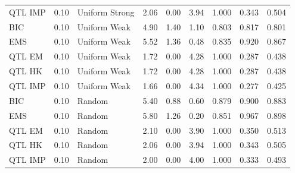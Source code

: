 \documentclass[
  12pt,
]{article}
\begin{document}
\begin{table}
{\begin{tabular}[t]{lrlrrrrrr}
QTL IMP & 0.10 & Uniform Strong & 2.06 & 0.00 & 3.94 & 1.000 & 0.343 & 0.504\\
\addlinespace
BIC & 0.10 & Uniform Weak & 4.90 & 1.40 & 1.10 & 0.803 & 0.817 & 0.801\\
EMS & 0.10 & Uniform Weak & 5.52 & 1.36 & 0.48 & 0.835 & 0.920 & 0.867\\
QTL EM & 0.10 & Uniform Weak & 1.72 & 0.00 & 4.28 & 1.000 & 0.287 & 0.438\\
QTL HK & 0.10 & Uniform Weak & 1.72 & 0.00 & 4.28 & 1.000 & 0.287 & 0.438\\
QTL IMP & 0.10 & Uniform Weak & 1.66 & 0.00 & 4.34 & 1.000 & 0.277 & 0.425\\
\addlinespace
BIC & 0.10 & Random & 5.40 & 0.88 & 0.60 & 0.879 & 0.900 & 0.883\\
EMS & 0.10 & Random & 5.80 & 1.26 & 0.20 & 0.851 & 0.967 & 0.898\\
QTL EM & 0.10 & Random & 2.10 & 0.00 & 3.90 & 1.000 & 0.350 & 0.513\\
QTL HK & 0.10 & Random & 2.06 & 0.00 & 3.94 & 1.000 & 0.343 & 0.505\\
QTL IMP & 0.10 & Random & 2.00 & 0.00 & 4.00 & 1.000 & 0.333 & 0.493\\
\bottomrule
\end{tabular}}
\end{table}
\end{document}
